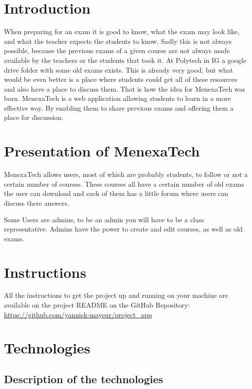 \documentclass[12pt,a4paper]{article}
\begin{document}

\tableofcontents
\break


\section{Introduction}

When preparing for an exam it is good to know, what the exam may look like, and
what the teacher expects the students to know. Sadly this is not always
possible, because the previous exams of a given course are not always made
available by the teachers or the students that took it. At Polytech in IG a
google drive folder with some old exams exists. This is already very good, but
what would be even better is a place where students could get all of these
resources and also have a place to discuss them. That is how the idea for
MenexaTech was born. MenexaTech is a web application allowing students to
learn in a more effective way. By enabling  them to share previous exams and
offering them a place for discussion.


\section{Presentation of MenexaTech}

MenexaTech allows users, most of which are probably students, to follow or not
a certain number of courses. These courses all have a certain number of old
exams the user can download and each of them has a little forum where users
can discuss there answers.

Some Users are admins, to be an admin you will have to be a class
representative. Admins have the power to create and edit courses, as well as
old exams.


\section{Instructions}

All the instructions to get the project up and running on your machine are
available on the project README on the GitHub Repository: 
\url{https://github.com/yannick-mayeur/project_app}

\section{Technologies}

\subsection{Description of the technologies}
\end{document}
